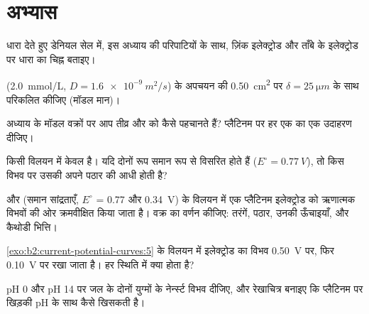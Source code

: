 \section{अभ्यास}

\begin{exercise}[$\star$]\label{exo:b2:current-potential-curves:1}
धारा देते हुए डेनियल सेल में, इस अध्याय की परिपाटियों के साथ,
ज़िंक इलेक्ट्रोड और ताँबे के इलेक्ट्रोड पर धारा का चिह्न
बताइए।
\end{exercise}

\begin{exercise}[$\star$]\label{exo:b2:current-potential-curves:2}
 (\qty{2.0}{mmol/L}, $D =
\qty{1.6e-9}{m^2/s}$) के अपचयन की  \qty{0.50}{cm^2} पर $\delta = \qty{25}{\micro m}$ के साथ परिकलित कीजिए
(मॉडल मान)।
\end{exercise}

\begin{exercise}[$\star$]\label{exo:b2:current-potential-curves:3}
अध्याय के मॉडल वक्रों पर आप तीव्र और  को कैसे पहचानते हैं?
प्लैटिनम पर हर एक का एक उदाहरण दीजिए।
\end{exercise}

\begin{exercise}[$\star$]\label{exo:b2:current-potential-curves:4}
किसी विलयन में केवल  है। यदि दोनों रूप समान रूप से विसरित होते हैं ($E^\circ = \qty{0.77}{V}$),
तो किस विभव पर उसकी  अपने पठार की आधी होती है?
\end{exercise}

\begin{exercise}[$\star\star$]\label{exo:b2:current-potential-curves:5}
 और  (समान
सांद्रताएँ, $E^\circ$ = 0.77 और \qty{0.34}{V}) के विलयन में एक प्लैटिनम इलेक्ट्रोड को ऋणात्मक
विभवों की ओर क्रमवीक्षित किया जाता है। वक्र का वर्णन कीजिए: तरंगें, पठार, उनकी ऊँचाइयाँ, और
कैथोडी भित्ति।
\end{exercise}

\begin{exercise}[$\star\star$]\label{exo:b2:current-potential-curves:6}
\cref{exo:b2:current-potential-curves:5} के विलयन में इलेक्ट्रोड का विभव
\qty{0.50}{V} पर, फिर \qty{0.10}{V} पर रखा जाता है। हर स्थिति में
क्या होता है?
\end{exercise}

\begin{exercise}[$\star\star$]\label{exo:b2:current-potential-curves:7}
pH 0 और pH 14 पर जल के दोनों युग्मों के नेर्न्स्ट विभव दीजिए, और
रेखाचित्र बनाइए कि प्लैटिनम पर खिड़की pH के साथ कैसे खिसकती है।
\end{exercise}

